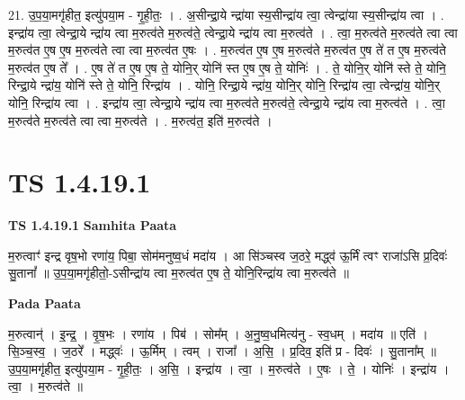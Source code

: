 \documentclass[17pt]{extarticle}
\begin{document}
21. उ॒प॒या॒मगृ॑हीत॒ इत्यु॑पया॒म - गृ॒ही॒तः॒ । . अ॒सीन्द्रा॒ये न्द्रा॑या स्य॒सीन्द्रा॑य त्वा॒ त्वेन्द्रा॑या स्य॒सीन्द्रा॑य त्वा । . इन्द्रा॑य त्वा॒ त्वेन्द्रा॒ये न्द्रा॑य त्वा म॒रुत्व॑ते म॒रुत्व॑ते॒ त्वेन्द्रा॒ये न्द्रा॑य त्वा म॒रुत्व॑ते । . त्वा॒ म॒रुत्व॑ते म॒रुत्व॑ते त्वा त्वा म॒रुत्व॑त ए॒ष ए॒ष म॒रुत्व॑ते त्वा त्वा म॒रुत्व॑त ए॒षः । . म॒रुत्व॑त ए॒ष ए॒ष म॒रुत्व॑ते म॒रुत्व॑त ए॒ष ते॑ त ए॒ष म॒रुत्व॑ते म॒रुत्व॑त ए॒ष ते᳚ । . ए॒ष ते॑ त ए॒ष ए॒ष ते॒ योनि॒र् योनि॑ स्त ए॒ष ए॒ष ते॒ योनिः॑ । . ते॒ योनि॒र् योनि॑ स्ते ते॒ योनि॒ रिन्द्रा॒ये न्द्रा॑य॒ योनि॑ स्ते ते॒ योनि॒ रिन्द्रा॑य । . योनि॒ रिन्द्रा॒ये न्द्रा॑य॒ योनि॒र् योनि॒ रिन्द्रा॑य त्वा॒ त्वेन्द्रा॑य॒ योनि॒र् योनि॒ रिन्द्रा॑य त्वा । . इन्द्रा॑य त्वा॒ त्वेन्द्रा॒ये न्द्रा॑य त्वा म॒रुत्व॑ते म॒रुत्व॑ते॒ त्वेन्द्रा॒ये न्द्रा॑य त्वा म॒रुत्व॑ते । . त्वा॒ म॒रुत्व॑ते म॒रुत्व॑ते त्वा त्वा म॒रुत्व॑ते । . म॒रुत्व॑त॒ इति॑ म॒रुत्व॑ते । \newline
\pagebreak
{}

\section{ TS 1.4.19.1 }

\textbf{TS 1.4.19.1 } \newline
\textbf{Samhita Paata} \newline

म॒रुत्वाꣳ॑ इन्द्र वृष॒भो रणा॑य॒ पिबा॒ सोम॑मनुष्व॒धं मदा॑य । आ सि॑ञ्चस्व ज॒ठरे॒ मद्ध्व॑ ऊ॒र्मिं त्वꣳ राजा॑ऽसि प्र॒दिवः॑ सु॒तानां᳚ ॥ उ॒प॒या॒मगृ॑हीतो॒-ऽसीन्द्रा॑य त्वा म॒रुत्व॑त ए॒ष ते॒ योनि॒रिन्द्रा॑य त्वा म॒रुत्व॑ते ॥ \newline

\textbf{Pada Paata} \newline

म॒रुत्वान्॑ । इ॒न्द्र॒ । वृ॒ष॒भः । रणा॑य । पिब॑ । सोम᳚म् । अ॒नु॒ष्व॒धमित्य॑नु - स्व॒धम् । मदा॑य ॥ एति॑ । सि॒ञ्च॒स्व॒ । ज॒ठरे᳚ । मद्ध्वः॑ । ऊ॒र्मिम् । त्वम् । राजा᳚ । अ॒सि॒ । प्र॒दिव॒ इति॑ प्र - दिवः॑ । सु॒ताना᳚म् ॥ उ॒प॒या॒मगृ॑हीत॒ इत्यु॑पया॒म - गृ॒ही॒तः॒ । अ॒सि॒ । इन्द्रा॑य । त्वा॒ । म॒रुत्व॑ते । ए॒षः । ते॒ । योनिः॑ । इन्द्रा॑य । त्वा॒ । म॒रुत्व॑ते ॥  \newline
\end{document}
